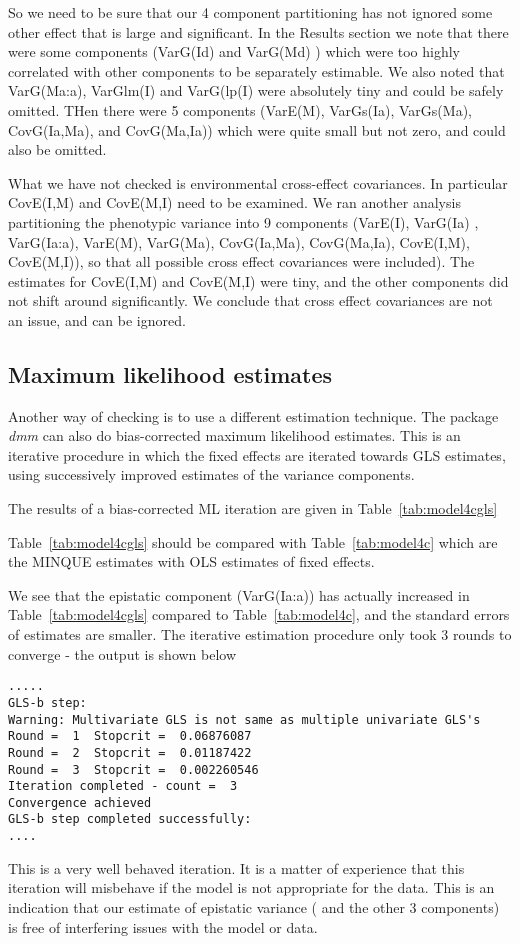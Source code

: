 \documentclass[titlepage]{article}  %
\begin{document}
So we need to be sure that our 4 component partitioning has not ignored some other effect that is large and significant. In the Results section we note that  there were some components (VarG(Id) and VarG(Md) ) which were too highly correlated with other components to be separately estimable. We also noted that VarG(Ma:a), VarGlm(I) and VarG(lp(I) were absolutely tiny and could be safely omitted. THen there were 5 components (VarE(M), VarGs(Ia), VarGs(Ma), CovG(Ia,Ma), and CovG(Ma,Ia))  which were quite small but not zero, and could also be omitted.

What we have not checked is environmental cross-effect covariances. In particular CovE(I,M) and CovE(M,I) need to be examined. We ran another analysis partitioning the phenotypic variance into 9 components (VarE(I), VarG(Ia) , VarG(Ia:a), VarE(M), VarG(Ma), CovG(Ia,Ma), CovG(Ma,Ia), CovE(I,M), CovE(M,I)), so that all possible cross effect covariances were included). The estimates for CovE(I,M) and CovE(M,I) were tiny, and the other components did not shift around significantly. We conclude that cross effect covariances are not an issue, and can be ignored.

\subsection{Maximum likelihood estimates}
Another way of checking is to use a different estimation technique. The package {\em dmm} can also do bias-corrected maximum likelihood estimates. This is an iterative procedure in which the fixed effects are iterated towards GLS estimates, using successively improved estimates of the variance components. 

The results of a bias-corrected ML iteration are given in Table~\ref{tab:model4cgls}

Table~\ref{tab:model4cgls} should be compared with Table~\ref{tab:model4c} which are the MINQUE estimates with OLS estimates of fixed effects. 

We see that the epistatic component (VarG(Ia:a)) has actually increased in Table~\ref{tab:model4cgls} compared to Table~\ref{tab:model4c}, and the standard errors of estimates are smaller. The iterative estimation procedure only took 3 rounds to converge - the output is shown below
\begin{verbatim}
.....
GLS-b step:
Warning: Multivariate GLS is not same as multiple univariate GLS's
Round =  1  Stopcrit =  0.06876087 
Round =  2  Stopcrit =  0.01187422 
Round =  3  Stopcrit =  0.002260546 
Iteration completed - count =  3 
Convergence achieved
GLS-b step completed successfully:
....
\end{verbatim}
This is a very well behaved iteration. It is a matter of experience that this iteration will misbehave if the model is not appropriate for the data. This is an indication that our estimate of epistatic variance ( and the other 3 components) is free of interfering issues with the model or data.
\end{document}
